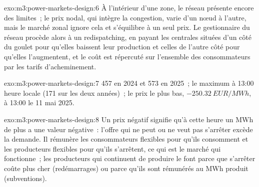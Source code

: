 \begin{solution}{exo:m3:power-markets-design:6}
À l'intérieur d'une zone, le réseau présente encore des limites~; le prix nodal, qui intègre la congestion,
varie d'un nœud à l'autre, mais le marché zonal ignore cela et s'équilibre à un seul prix. Le
gestionnaire du réseau procède alors à un redispatching, en payant les centrales situées d'un côté du goulet pour qu'elles baissent leur production et
celles de l'autre côté pour qu'elles l'augmentent, et le coût est répercuté sur
l'ensemble des consommateurs par les tarifs d'acheminement.
\end{solution}

\begin{solution}{exo:m3:power-markets-design:7}
457 en 2024 et 573 en 2025~; le maximum à 13:00 heure locale (171 sur les deux années)~; le
prix le plus bas, $-\qty{250.32}{EUR/MWh}$, à 13:00 le 11 mai 2025.
\end{solution}

\begin{solution}{exo:m3:power-markets-design:8}
Un prix négatif signifie qu'à cette heure un MWh de plus a une valeur négative~: l'offre qui ne peut
ou ne veut pas s'arrêter excède la demande. Il rémunère les consommateurs flexibles pour qu'ils consomment et les producteurs flexibles
pour qu'ils s'arrêtent, ce qui est le marché qui fonctionne~; les producteurs qui continuent de produire le font parce que s'arrêter
coûte plus cher (redémarrages) ou parce qu'ils sont rémunérés au MWh produit (subventions).
\end{solution}

